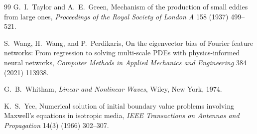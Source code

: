 \documentclass[11pt]{article}
\begin{document}
\begin{thebibliography}{99}
G.~I.~Taylor and A.~E.~Green,
Mechanism of the production of small eddies from large ones,
\emph{Proceedings of the Royal Society of London A} 158 (1937) 499--521.

S.~Wang, H.~Wang, and P.~Perdikaris,
On the eigenvector bias of Fourier feature networks: From regression to
solving multi-scale PDEs with physics-informed neural networks,
\emph{Computer Methods in Applied Mechanics and Engineering} 384 (2021)
113938.

G.~B.~Whitham,
\emph{Linear and Nonlinear Waves}, Wiley, New York, 1974.

K.~S.~Yee,
Numerical solution of initial boundary value problems involving
Maxwell's equations in isotropic media,
\emph{IEEE Transactions on Antennas and Propagation} 14(3) (1966) 302--307.

\end{thebibliography}
\end{document}
